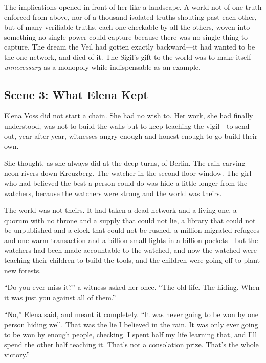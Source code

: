 \documentclass[12pt,letterpaper]{book}
\begin{document}
The implications opened in front of her like a landscape. A world not of one truth
enforced from above, nor of a thousand isolated truths shouting past each other, but
of many verifiable truths, each one checkable by all the others, woven into something
no single power could capture because there was no single thing to capture. The
dream the Veil had gotten exactly backward---it had wanted to be the one network, and
died of it. The Sigil's gift to the world was to make itself \emph{unnecessary} as a
monopoly while indispensable as an example.

\hypertarget{scene-3-what-elena-kept}{%
\subsection{Scene 3: What Elena
Kept}\label{scene-3-what-elena-kept}}

Elena Voss did not start a chain. She had no wish to. Her work, she had finally
understood, was not to build the walls but to keep teaching the vigil---to send out,
year after year, witnesses angry enough and honest enough to go build their own.

She thought, as she always did at the deep turns, of Berlin. The rain carving neon
rivers down Kreuzberg. The watcher in the second-floor window. The girl who had
believed the best a person could do was hide a little longer from the watchers,
because the watchers were strong and the world was theirs.

The world was not theirs. It had taken a dead network and a living one, a quorum with
no throne and a supply that could not lie, a library that could not be unpublished and
a clock that could not be rushed, a million migrated refugees and one warm transaction
and a billion small lights in a billion pockets---but the watchers had been made
accountable to the watched, and now the watched were teaching their children to build
the tools, and the children were going off to plant new forests.

``Do you ever miss it?'' a witness asked her once. ``The old life. The hiding. When it
was just you against all of them.''

``No,'' Elena said, and meant it completely. ``It was never going to be won by one
person hiding well. That was the lie I believed in the rain. It was only ever going to
be won by enough people, checking. I spent half my life learning that, and I'll spend
the other half teaching it. That's not a consolation prize. That's the whole victory.''
\end{document}
